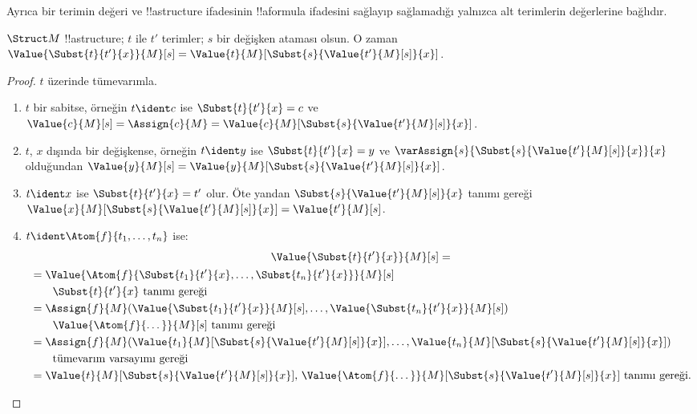 \documentclass[../../../include/open-logic-section]{subfiles}
\begin{document}
Ayrıca bir terimin değeri ve !!a{structure} ifadesinin !!a{formula}
ifadesini sağlayıp sağlamadığı yalnızca alt terimlerin değerlerine
bağlıdır.

\begin{prop}
$\Struct M$ !!a{structure}; $t$ ile $t'$ terimler; $s$ bir değişken
ataması olsun. O zaman
$\Value{\Subst{t}{t'}{x}}{M}[s]=
\Value{t}{M}[\Subst{s}{\Value{t'}{M}[s]}{x}]$.
\end{prop}

\begin{proof}
$t$ üzerinde tümevarımla.
\begin{enumerate}
\item $t$ bir sabitse, örneğin $t\ident c$ ise
  $\Subst{t}{t'}{x}=c$ ve
  $\Value{c}{M}[s]=\Assign{c}{M}=
  \Value{c}{M}[\Subst{s}{\Value{t'}{M}[s]}{x}]$.

\item $t$, $x$ dışında bir değişkense, örneğin $t\ident y$ ise
  $\Subst{t}{t'}{x}=y$ ve
  $\varAssign{s}{\Subst{s}{\Value{t'}{M}[s]}{x}}{x}$ olduğundan
  $\Value{y}{M}[s]=
  \Value{y}{M}[\Subst{s}{\Value{t'}{M}[s]}{x}]$.

\item $t\ident x$ ise $\Subst{t}{t'}{x}=t'$ olur. Öte yandan
  $\Subst{s}{\Value{t'}{M}[s]}{x}$ tanımı gereği
  $\Value{x}{M}[\Subst{s}{\Value{t'}{M}[s]}{x}]
  =\Value{t'}{M}[s]$.

\item $t\ident\Atom{f}{t_1,\dots,t_n}$ ise:
\begin{multline*}
  \Value{\Subst{t}{t'}{x}}{M}[s]  = \\
  \begin{aligned}[b]
& = \Value{\Atom{f}{\Subst{t_1}{t'}{x}, \dots, \Subst{t_n}{t'}{x}}}{M}[s]\\
& \qquad    \text{$\Subst{t}{t'}{x}$ tanımı gereği}\\
& = \Assign{f}{M}(\Value{\Subst{t_1}{t'}{x}}{M}[s], \dots,
    \Value{\Subst{t_n}{t'}{x}}{M}[s])\\
& \qquad  \text{$\Value{\Atom{f}{\dots}}{M}[s]$ tanımı gereği}\\
& = \Assign{f}{M}(\Value{t_1}{M}[\Subst{s}{\Value{t'}{M}[s]}{x}], \dots,
   \Value{t_n}{M}[\Subst{s}{\Value{t'}{M}[s]}{x}])\\
& \qquad    \text{tümevarım varsayımı gereği}\\
& = \Value{t}{M}[\Subst{s}{\Value{t'}{M}[s]}{x}]
    \text{, $\Value{\Atom{f}{\dots}}{M}[\Subst{s}{\Value{t'}{M}[s]}{x}]$ tanımı gereği.}
  \end{aligned}
\end{multline*}
\end{enumerate}
\end{proof}
\end{document}
